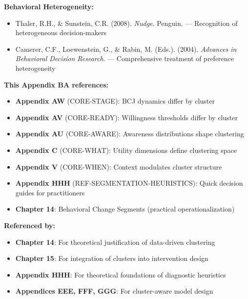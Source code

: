 \textbf{Behavioral Heterogeneity:}
\begin{itemize}
\item Thaler, R.H., \& Sunstein, C.R. (2008). \textit{Nudge}. Penguin.
  --- Recognition of heterogeneous decision-makers
\item Camerer, C.F., Loewenstein, G., \& Rabin, M. (Eds.). (2004).
  \textit{Advances in Behavioral Decision Research}. --- Comprehensive treatment
  of preference heterogeneity
\end{itemize}


\begin{tcolorbox}[colback=purple!5!white, colframe=purple!75!black,
    title=Cross-References]

\textbf{This Appendix BA references:}
\begin{itemize}[nosep]
\item \textbf{Appendix AW} (CORE-STAGE): BCJ dynamics differ by cluster
\item \textbf{Appendix AV} (CORE-READY): Willingness thresholds differ by cluster
\item \textbf{Appendix AU} (CORE-AWARE): Awareness distributions shape clustering
\item \textbf{Appendix C} (CORE-WHAT): Utility dimensions define clustering space
\item \textbf{Appendix V} (CORE-WHEN): Context modulates cluster structure
\item \textbf{Appendix HHH} (REF-SEGMENTATION-HEURISTICS): Quick decision guides for practitioners
\item \textbf{Chapter 14}: Behavioral Change Segments (practical operationalization)
\end{itemize}

\textbf{Referenced by:}
\begin{itemize}[nosep]
\item \textbf{Chapter 14}: For theoretical justification of data-driven clustering
\item \textbf{Chapter 15}: For integration of clusters into intervention design
\item \textbf{Appendix HHH}: For theoretical foundations of diagnostic heuristics
\item \textbf{Appendices EEE, FFF, GGG}: For cluster-aware model design
\end{itemize}

\end{tcolorbox}


